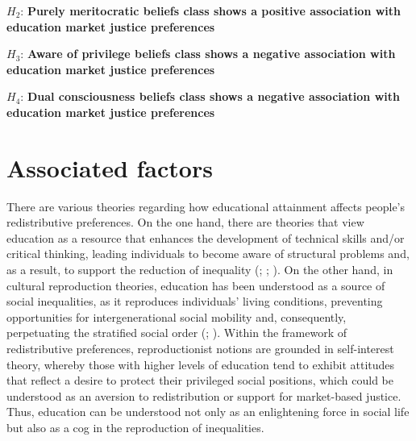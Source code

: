 \documentclass[
  spanish,
  a4paper,
  oneside]{scrbook}
\begin{document}
\(H_{2}\): \textbf{Purely meritocratic beliefs class shows a positive
association with education market justice preferences}

\(H_{3}\): \textbf{Aware of privilege beliefs class shows a negative
association with education market justice preferences}

\(H_{4}\): \textbf{Dual consciousness beliefs class shows a negative
association with education market justice preferences}

\section{Associated factors}\label{associated-factors}

There are various theories regarding how educational attainment affects
people's redistributive preferences. On the one hand, there are theories
that view education as a resource that enhances the development of
technical skills and/or critical thinking, leading individuals to become
aware of structural problems and, as a result, to support the reduction
of inequality (;
;
). On the other
hand, in cultural reproduction theories, education has been understood
as a source of social inequalities, as it reproduces individuals' living
conditions, preventing opportunities for intergenerational social
mobility and, consequently, perpetuating the stratified social order
(;
). Within
the framework of redistributive preferences, reproductionist notions are
grounded in self-interest theory, whereby those with higher levels of
education tend to exhibit attitudes that reflect a desire to protect
their privileged social positions, which could be understood as an
aversion to redistribution or support for market-based justice. Thus,
education can be understood not only as an enlightening force in social
life but also as a cog in the reproduction of inequalities.
\end{document}

